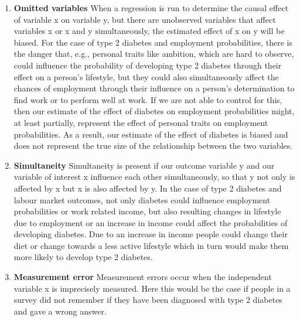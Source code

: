 \begin{enumerate}

\item \textbf{Omitted variables}
When a regression is run to determine the causal effect of variable x on variable y, but there are unobserved variables that affect variables x or x and y simultaneously, the estimated effect of x on y will be biased. For the case of type 2 diabetes and employment probabilities, there is the danger that, e.g., personal traits like ambition, which are hard to observe, could influence the probability of developing type 2 diabetes through their effect on a person's lifestyle, but they could also simultaneously affect the chances of employment through their influence on a person's determination to find work or to perform well at work. If we are not able to control for this, then our estimate of the effect of diabetes on employment probabilities might, at least partially, represent the effect of personal traits on employment probabilities. As a result, our estimate of the effect of diabetes is biased and does not represent the true size of the relationship between the two variables.
\item \textbf{Simultaneity}
Simultaneity is present if our outcome variable y and our variable of interest x influence each other simultaneously, so that y not only is affected by x but x is also affected by y. In the case of type 2 diabetes and labour market outcomes, not only diabetes could influence employment probabilities or work related income, but also resulting changes in lifestyle due to employment or an increase in income could affect the probabilities of developing diabetes. Due to an increase in income people could change their diet or change towards a less active lifestyle which in turn would make them more likely to develop type 2 diabetes.
\item \textbf{Measurement error}
Measurement errors occur when the independent variable x is imprecisely measured. Here this would be the case if people in a survey did not remember if they have been diagnosed with type 2 diabetes and gave a wrong answer.
\end{enumerate}

